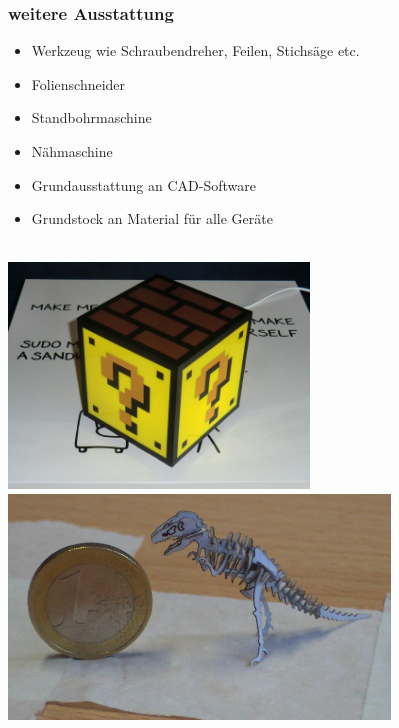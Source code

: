 \documentclass[t]{beamer}
\begin{document}

\begin{frame}
	\frametitle{weitere Ausstattung}
	\begin{itemize}
		\item Werkzeug wie Schraubendreher, Feilen, Stichsäge etc.
		\item Folienschneider
		\item Standbohrmaschine
		\item Nähmaschine
		\item Grundausstattung an CAD-Software
		\item Grundstock an Material für alle Geräte
	\end{itemize}
    \begin{center}
        ~\\
    \includegraphics[height=6cm]{../img/mariolampe.jpg}
    \hspace{1em}                           
    \includegraphics[height=6cm]{../img/tinysaur.jpg}
    \end{center}
\end{frame}
\end{document}
